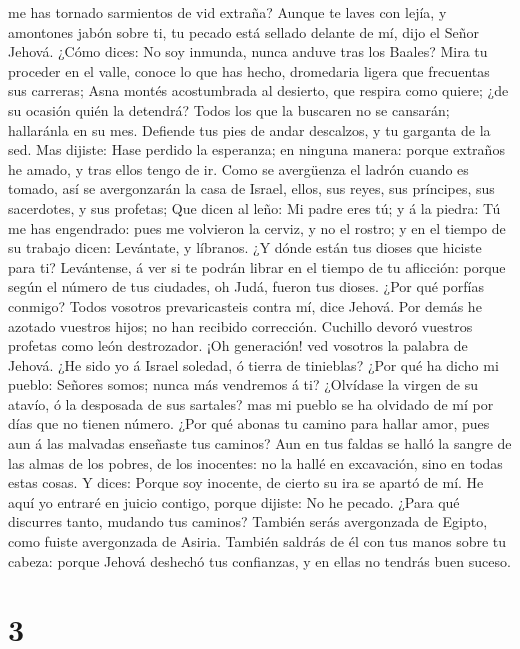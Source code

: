 me has tornado sarmientos de vid extraña?  Aunque te laves
con lejía, y amontones jabón sobre ti, tu pecado está sellado delante de
mí, dijo el Señor Jehová.  ¿Cómo dices: No soy inmunda,
nunca anduve tras los Baales? Mira tu proceder en el valle, conoce lo
que has hecho, dromedaria ligera que frecuentas sus carreras;
 Asna montés acostumbrada al desierto, que respira como
quiere; ¿de su ocasión quién la detendrá? Todos los que la buscaren no
se cansarán; hallaránla en su mes.  Defiende tus pies de
andar descalzos, y tu garganta de la sed. Mas dijiste: Hase perdido la
esperanza; en ninguna manera: porque extraños he amado, y tras ellos
tengo de ir.  Como se avergüenza el ladrón cuando es
tomado, así se avergonzarán la casa de Israel, ellos, sus reyes, sus
príncipes, sus sacerdotes, y sus profetas;  Que dicen al
leño: Mi padre eres tú; y á la piedra: Tú me has engendrado: pues me
volvieron la cerviz, y no el rostro; y en el tiempo de su trabajo dicen:
Levántate, y líbranos.  ¿Y dónde están tus dioses que
hiciste para ti? Levántense, á ver si te podrán librar en el tiempo de
tu aflicción: porque según el número de tus ciudades, oh Judá, fueron
tus dioses.  ¿Por qué porfías conmigo? Todos vosotros
prevaricasteis contra mí, dice Jehová.  Por demás he
azotado vuestros hijos; no han recibido corrección. Cuchillo devoró
vuestros profetas como león destrozador.  ¡Oh generación!
ved vosotros la palabra de Jehová. ¿He sido yo á Israel soledad, ó
tierra de tinieblas? ¿Por qué ha dicho mi pueblo: Señores somos; nunca
más vendremos á ti?  ¿Olvídase la virgen de su atavío, ó la
desposada de sus sartales? mas mi pueblo se ha olvidado de mí por días
que no tienen número.  ¿Por qué abonas tu camino para
hallar amor, pues aun á las malvadas enseñaste tus caminos?
 Aun en tus faldas se halló la sangre de las almas de los
pobres, de los inocentes: no la hallé en excavación, sino en todas estas
cosas.  Y dices: Porque soy inocente, de cierto su ira se
apartó de mí. He aquí yo entraré en juicio contigo, porque dijiste: No
he pecado.  ¿Para qué discurres tanto, mudando tus caminos?
También serás avergonzada de Egipto, como fuiste avergonzada de Asiria.
 También saldrás de él con tus manos sobre tu cabeza:
porque Jehová deshechó tus confianzas, y en ellas no tendrás buen
suceso.

\hypertarget{section-2}{%
\section{3}\label{section-2}}

